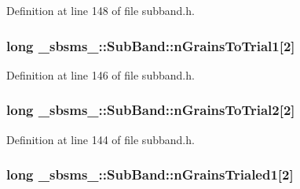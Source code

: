 Definition at line 148 of file subband.\+h.

\subsubsection[{\texorpdfstring{n\+Grains\+To\+Trial1}{nGrainsToTrial1}}]{\setlength{\rightskip}{0pt plus 5cm}long \+\_\+sbsms\+\_\+\+::\+Sub\+Band\+::n\+Grains\+To\+Trial1\mbox{[}2\mbox{]}\hspace{0.3cm}{\ttfamily [protected]}}\hypertarget{class__sbsms___1_1_sub_band_a2be889877be36d00c0840ca97cbc24ea}{}\label{class__sbsms___1_1_sub_band_a2be889877be36d00c0840ca97cbc24ea}


Definition at line 146 of file subband.\+h.

\subsubsection[{\texorpdfstring{n\+Grains\+To\+Trial2}{nGrainsToTrial2}}]{\setlength{\rightskip}{0pt plus 5cm}long \+\_\+sbsms\+\_\+\+::\+Sub\+Band\+::n\+Grains\+To\+Trial2\mbox{[}2\mbox{]}\hspace{0.3cm}{\ttfamily [protected]}}\hypertarget{class__sbsms___1_1_sub_band_a1f318d161870737d8ebc93f62e44a315}{}\label{class__sbsms___1_1_sub_band_a1f318d161870737d8ebc93f62e44a315}


Definition at line 144 of file subband.\+h.

\subsubsection[{\texorpdfstring{n\+Grains\+Trialed1}{nGrainsTrialed1}}]{\setlength{\rightskip}{0pt plus 5cm}long \+\_\+sbsms\+\_\+\+::\+Sub\+Band\+::n\+Grains\+Trialed1\mbox{[}2\mbox{]}\hspace{0.3cm}{\ttfamily [protected]}}\hypertarget{class__sbsms___1_1_sub_band_a16dedcd05c8c51a6b4ca574ec2899907}{}\label{class__sbsms___1_1_sub_band_a16dedcd05c8c51a6b4ca574ec2899907}


